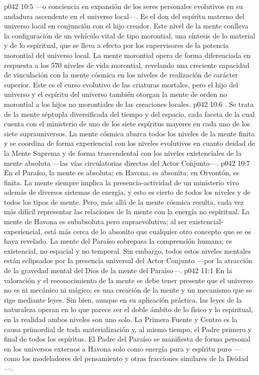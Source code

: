 \vs p042 10:5  ---o conciencia en expansión de los seres personales evolutivos en su andadura ascendente en el universo local---. Es el don del espíritu materno del universo local en conjunción con el hijo creador. Este nivel de la mente conlleva la configuración de un vehículo vital de tipo morontial, una síntesis de lo material y de lo espiritual, que se lleva a efecto por los supervisores de la potencia morontial del universo local. La mente morontial opera de forma diferenciada en respuesta a los 570 niveles de vida morontial, revelando una creciente capacidad de vinculación con la mente cósmica en los niveles de realización de carácter superior. Este es el curso evolutivo de las criaturas mortales, pero el hijo del universo y el espíritu del universo también otorgan la mente de orden no morontial a los hijos no morontiales de las creaciones locales.
\vs p042 10:6 \pc {}. Se trata de la mente séptupla diversificada del tiempo y del espacio, cada faceta de la cual cuenta con el ministerio de uno de los siete espíritus mayores en cada uno de los siete suprauniversos. La mente cósmica abarca todos los niveles de la mente finita y se coordina de forma experiencial con los niveles evolutivos en cuanto deidad de la Mente Suprema y de forma trascendental con los niveles existenciales de la mente absoluta ---las vías circulatorias directas del Actor Conjunto---.
\vs p042 10:7 En el Paraíso, la mente es absoluta; en Havona, es absonita; en Orvontón, es finita. La mente siempre implica la presencia\hyp{}actividad de un ministerio vivo además de diversos sistemas de energía, y esto es cierto de todos los niveles y de todos los tipos de mente. Pero, más allá de la mente cósmica resulta, cada vez más difícil representar las relaciones de la mente con la energía no espiritual. La mente de Havona es subabsoluta pero supraevolutiva; al ser existencial\hyp{}experiencial, está más cerca de lo absonito que cualquier otro concepto que se os haya revelado. La mente del Paraíso sobrepasa la comprensión humana; es existencial, no espacial y no temporal. Sin embargo, todos estos niveles mentales están eclipsados por la presencia universal del Actor Conjunto ---por la atracción de la gravedad mental del Dios de la mente del Paraíso---.
\vs p042 11:1 En la valoración y el reconocimiento de la mente se debe tener presente que el universo no es ni mecánico ni mágico; es una creación de la mente y un mecanismo que se rige mediante leyes. Sin bien, aunque en su aplicación práctica, las leyes de la naturaleza operan en lo que parece ser el doble ámbito de lo físico y lo espiritual, en la realidad ambos niveles son uno solo. La Primera Fuente y Centro es la causa primordial de toda materialización y, al mismo tiempo, el Padre primero y final de todos los espíritus. El Padre del Paraíso se manifiesta de forma personal en los universos externos a Havona solo como energía pura y espíritu puro ---como los modeladores del pensamiento y otras fracciones similares de la Deidad---.
